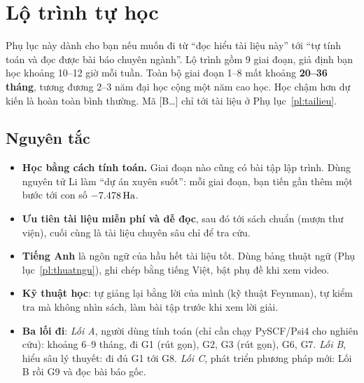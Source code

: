 \chapter{Lộ trình tự học}
\label{pl:lotrinh}

Phụ lục này dành cho bạn nếu muốn đi từ ``đọc hiểu tài liệu này'' tới ``tự tính toán và đọc được bài báo chuyên ngành''. Lộ trình gồm 9 giai đoạn, giả định bạn học khoảng 10--12 giờ mỗi tuần. Toàn bộ giai đoạn 1--8 mất khoảng \textbf{20--36 tháng}, tương đương 2--3 năm đại học cộng một năm cao học. Học chậm hơn dự kiến là hoàn toàn bình thường. Mã [B\ldots] chỉ tới tài liệu ở Phụ lục~\ref{pl:tailieu}.

\section*{Nguyên tắc}
\begin{itemize}
\item \textbf{Học bằng cách tính toán.} Giai đoạn nào cũng có bài tập lập trình. Dùng nguyên tử Li làm ``dự án xuyên suốt'': mỗi giai đoạn, bạn tiến gần thêm một bước tới con số $-7.478\,\mathrm{Ha}$.
\item \textbf{Ưu tiên tài liệu miễn phí và dễ đọc}, sau đó tới sách chuẩn (mượn thư viện), cuối cùng là tài liệu chuyên sâu chỉ để tra cứu.
\item \textbf{Tiếng Anh} là ngôn ngữ của hầu hết tài liệu tốt. Dùng bảng thuật ngữ (Phụ lục~\ref{pl:thuatngu}), ghi chép bằng tiếng Việt, bật phụ đề khi xem video.
\item \textbf{Kỹ thuật học}: tự giảng lại bằng lời của mình (kỹ thuật Feynman), tự kiểm tra mà không nhìn sách, làm bài tập trước khi xem lời giải.
\item \textbf{Ba lối đi}: \emph{Lối A}, người dùng tính toán (chỉ cần chạy PySCF/Psi4 cho nghiên cứu): khoảng 6--9 tháng, đi G1 (rút gọn), G2, G3 (rút gọn), G6, G7. \emph{Lối B}, hiểu sâu lý thuyết: đi đủ G1 tới G8. \emph{Lối C}, phát triển phương pháp mới: Lối B rồi G9 và đọc bài báo gốc.
\end{itemize}


